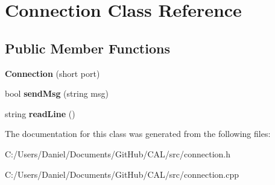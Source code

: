 \hypertarget{class_connection}{}\section{Connection Class Reference}
\label{class_connection}
\subsection*{Public Member Functions}
\begin{DoxyCompactItemize}
\item 
\hypertarget{class_connection_a8089476d48ba545f44e691cd4bd0278d}{}\label{class_connection_a8089476d48ba545f44e691cd4bd0278d} 
{\bfseries Connection} (short port)
\item 
\hypertarget{class_connection_a4b9f6db1fb42fc9857f829fa0bc52e6e}{}\label{class_connection_a4b9f6db1fb42fc9857f829fa0bc52e6e} 
bool {\bfseries send\+Msg} (string msg)
\item 
\hypertarget{class_connection_a1df16b436751b686d96c24ca0c498659}{}\label{class_connection_a1df16b436751b686d96c24ca0c498659} 
string {\bfseries read\+Line} ()
\end{DoxyCompactItemize}


The documentation for this class was generated from the following files\+:\begin{DoxyCompactItemize}
\item 
C\+:/\+Users/\+Daniel/\+Documents/\+Git\+Hub/\+C\+A\+L/src/connection.\+h\item 
C\+:/\+Users/\+Daniel/\+Documents/\+Git\+Hub/\+C\+A\+L/src/connection.\+cpp\end{DoxyCompactItemize}
